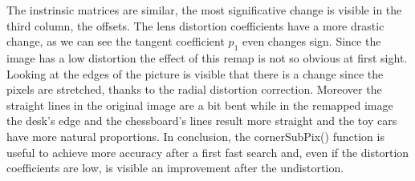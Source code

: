 \documentclass[11pt,a4paper]{article}
\newcommand{\cc}{\fontfamily{txtt}\selectfont}
\begin{document}
The instrinsic matrices are similar, the most significative change is visible in the third column, the offsets.
The lens distortion coefficients have a more drastic change, as we can see the tangent coefficient $p_1$ even changes sign.\newline
Since the image has a low distortion the effect of this remap is not so obvious at first sight.
Looking at the edges of the picture is visible that there is a change since the pixels are stretched, thanks to the radial distortion correction.
Moreover the straight lines in the original image are a bit bent while in the remapped image the desk's edge and the chessboard's lines result more straight and the toy cars have more natural proportions.
In conclusion, the {\cc cornerSubPix()} function is useful to achieve more accuracy after a first fast search and, even if the distortion coefficients are low, is visible an improvement after the undistortion.
\end{document}
